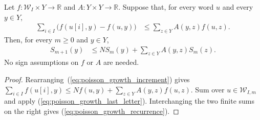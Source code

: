 \begin{lemma}
\label{lem:poisson_word_growth_recurrence}
\leanok
{}
Let $f:\mathcal W_I\times Y\to\mathbb R$ and
$A:Y\times Y\to\mathbb R$.  Suppose that, for every word $u$ and
every $y\in Y$,
\begin{align}
 \sum_{i\in I}\bigl(f(u[i],y)-f(u,y)\bigr)
 &\leq\sum_{z\in Y}A(y,z)f(u,z).
 \label{eq:poisson_growth_increment}
\end{align}
Then, for every $m\geq0$ and $y\in Y$,
\begin{align}
 S_{m+1}(y)&\leq N S_m(y)+\sum_{z\in Y}A(y,z)S_m(z).
 \label{eq:poisson_growth_recurrence}
\end{align}
No sign assumptions on $f$ or $A$ are needed.
\end{lemma}
\begin{proof}
\leanok
{}
Rearranging~(\ref{eq:poisson_growth_increment}) gives
$\sum_{i\in I}f(u[i],y)\leq Nf(u,y)+\sum_{z\in Y}A(y,z)f(u,z)$.
Sum over $u\in\mathcal W_{I,m}$ and apply
(\ref{eq:poisson_growth_last_letter}).
Interchanging the two finite sums on the right gives
(\ref{eq:poisson_growth_recurrence}).
\end{proof}

